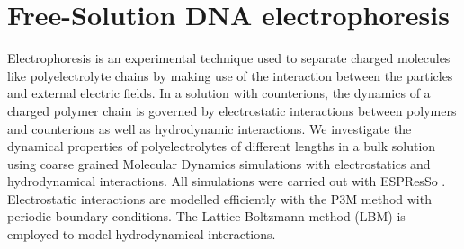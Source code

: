 \section{Free-Solution DNA electrophoresis}
Electrophoresis is an experimental technique used to separate charged molecules like polyelectrolyte chains by making use of the interaction between the particles and external electric fields. In a solution with counterions, the dynamics of a charged polymer chain is governed by electrostatic interactions between polymers and counterions as well as hydrodynamic interactions. We investigate the dynamical properties of polyelectrolytes of different lengths in a bulk solution using coarse grained Molecular Dynamics simulations with electrostatics and hydrodynamical interactions. All simulations were carried out with ESPResSo \cite{weik2019espresso}. Electrostatic interactions are modelled efficiently with the P3M method with periodic boundary conditions. The Lattice-Boltzmann method (LBM) is employed to model hydrodynamical interactions.

